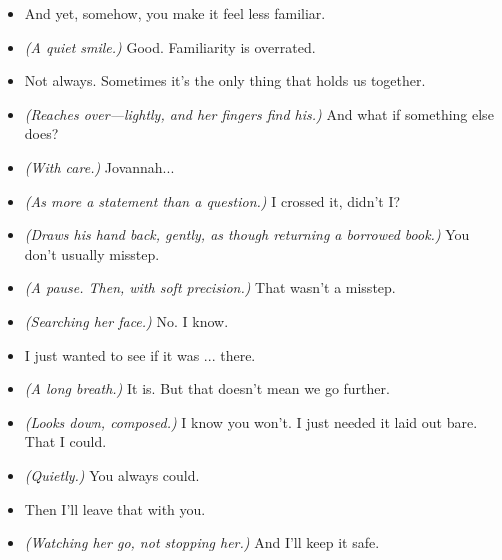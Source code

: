 \begin{itemize}
    \item[\textbf{Willard:}] And yet, somehow, you make it feel less familiar.

    \item[\textbf{Jovannah:}] \textit{(A quiet smile.)} Good. Familiarity is overrated.

    \item[\textbf{Willard:}] Not always. Sometimes it's the only thing that holds us together.

    \item[\textbf{Jovannah:}] \textit{(Reaches over—lightly, and her fingers find his.)} And what if something else does?

    \item[\textbf{Willard:}] \textit{(With care.)} Jovannah...

    \item[\textbf{Jovannah:}] \textit{(As more a statement than a question.)} I crossed it, didn’t I?

    \item[\textbf{Willard:}] \textit{(Draws his hand back, gently, as though returning a borrowed book.)} You don’t usually misstep.

    \item[\textbf{Jovannah:}] \textit{(A pause. Then, with soft precision.)} That wasn’t a misstep.

    \item[\textbf{Willard:}] \textit{(Searching her face.)} No. I know.

    \item[\textbf{Jovannah:}] I just wanted to see if it was ... there.

    \item[\textbf{Willard:}] \textit{(A long breath.)} It is. But that doesn’t mean we go further.

    \item[\textbf{Jovannah:}] \textit{(Looks down, composed.)} I know you won’t. I just needed it laid out bare. That I could.

    \item[\textbf{Willard:}] \textit{(Quietly.)} You always could.

    \item[\textbf{Jovannah:}] Then I’ll leave that with you.

    \item[\textbf{Willard:}] \textit{(Watching her go, not stopping her.)} And I’ll keep it safe.
\end{itemize}

